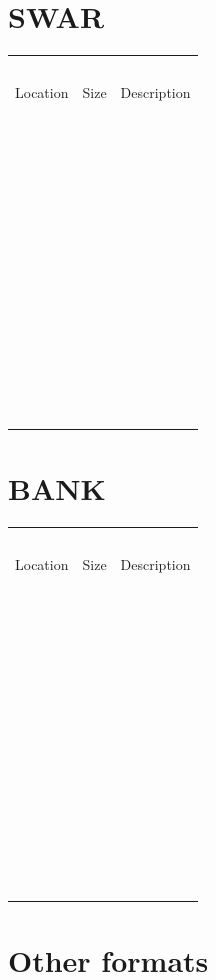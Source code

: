 \documentclass[
]{book}
\begin{document}
\hypertarget{swar-1}{%
\section{SWAR}\label{swar-1}}

\begin{longtable}[]{@{}lll@{}}
\toprule()
\endhead
  &   &   \\
Location & Size & Description \\
  &   &   \\
  &   &   \\
  &   &   \\
  &   &   \\
  &   &   \\
  &   &   \\
  &   &   \\
  &   &   \\
  &   &   \\
  &   &   \\
  &   &   \\
  &   &   \\
  &   &   \\
\bottomrule()
\end{longtable}

\hypertarget{bank}{%
\section{BANK}\label{bank}}

\begin{longtable}[]{@{}lll@{}}
\toprule()
\endhead
  &   &   \\
Location & Size & Description \\
  &   &   \\
  &   &   \\
  &   &   \\
  &   &   \\
  &   &   \\
  &   &   \\
  &   &   \\
  &   &   \\
  &   &   \\
  &   &   \\
  &   &   \\
  &   &   \\
  &   &   \\
\bottomrule()
\end{longtable}

\hypertarget{other-formats}{%
\section{Other formats}\label{other-formats}}
\end{document}
